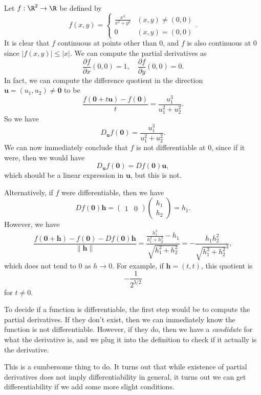 \documentclass[a4paper]{article}
\begin{document}
\begin{eg}
  Let $f: \R^2 \to \R$ be defined by
  \[
    f(x, y) =
    \begin{cases}
      \frac{x^3}{x^2 + y^2} & (x, y) \not= (0, 0)\\
      0 & (x, y) = (0, 0)
    \end{cases}.
  \]
  It is clear that $f$ continuous at points other than $0$, and $f$ is also continuous at $0$ since $|f(x, y)| \leq |x|$. We can compute the partial derivatives as
  \[
    \frac{\partial f}{\partial x}(0, 0) = 1,\quad \frac{\partial f}{\partial y} (0, 0) = 0.
  \]
  In fact, we can compute the difference quotient in the direction $\mathbf{u} = (u_1, u_2) \not= \mathbf{0}$ to be
  \[
    \frac{f(\mathbf{0} + t \mathbf{u}) - f(\mathbf{0})}{t} = \frac{u_1^3}{u_1^2 + u_2^2}.
  \]
  So we have
  \[
    D_\mathbf{u} f(\mathbf{0}) = \frac{u_1^3}{u_1^2 + u_2^2}.
  \]
  We can now immediately conclude that $f$ is not differentiable at $0$, since if it were, then we would have
  \[
    D_\mathbf{u} f(\mathbf{0}) = D f(\mathbf{0}) \mathbf{u},
  \]
  which should be a linear expression in $\mathbf{u}$, but this is not.

  Alternatively, if $f$ were differentiable, then we have
  \[
    D f(\mathbf{0}) \mathbf{h} =
    \begin{pmatrix}
      1 & 0
    \end{pmatrix}
    \begin{pmatrix}
      h_1\\h_2
    \end{pmatrix} = h_1.
  \]
  However, we have
  \[
    \frac{f(\mathbf{0} + \mathbf{h}) - f(\mathbf{0}) - D f(\mathbf{0}) \mathbf{h}}{\|\mathbf{h}\|} = \frac{\frac{h_1^3}{h_1^2 + h_2^2} - h_1}{\sqrt{h_1^2 + h_2^2}} = -\frac{h_1 h_2^2}{\sqrt{h_1^2 + h_2^2}^3},
  \]
  which does not tend to $0$ as $h \to 0$. For example, if $\mathbf{h} = (t, t)$, this quotient is
  \[
    -\frac{1}{2^{3/2}}
  \]
  for $t \not= 0$.
\end{eg}

To decide if a function is differentiable, the first step would be to compute the partial derivatives. If they don't exist, then we can immediately know the function is not differentiable. However, if they do, then we have a \emph{candidate} for what the derivative is, and we plug it into the definition to check if it actually is the derivative.

This is a cumbersome thing to do. It turns out that while existence of partial derivatives does not imply differentiability in general, it turns out we can get differentiability if we add some more slight conditions.
\end{document}
